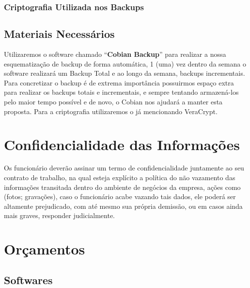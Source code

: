 \documentclass[12pt]{article}
\begin{document}
\subsubsection{Criptografia Utilizada nos Backups}

\subsection{Materiais Necessários}
Utilizaremos o software chamado “\textbf{Cobian Backup}” para realizar a nossa esquematização de backup de forma automática, 1 (uma) vez dentro da semana o software realizará um Backup Total e ao longo da semana, backups incrementais. Para concretizar o backup é de extrema importância possuirmos espaço extra para realizar os backups totais e incrementais, e sempre tentando armazená-los pelo maior tempo possível e de novo, o Cobian nos ajudará a manter esta proposta. Para a criptografia utilizaremos o já mencionando VeraCrypt.

\section{Confidencialidade das Informações}
Os funcionário deverão assinar um termo de confidencialidade juntamente ao seu contrato de trabalho, na qual esteja explícito a política do não vazamento das informações transitada dentro do ambiente de negócios da empresa, ações como (fotos; gravações), caso o funcionário acabe vazando tais dados, ele poderá ser altamente prejudicado, com até mesmo sua própria demissão, ou em casos ainda mais graves, responder judicialmente.

\section{Orçamentos}

\subsection{Softwares}
\end{document}
